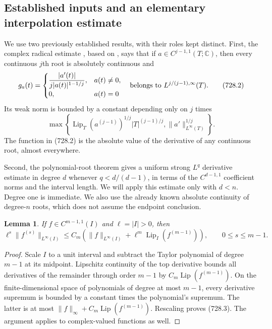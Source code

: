 \documentclass[11pt,a4paper]{article}
\newtheorem{lemma}[theorem]{Lemma}
\theoremstyle{remark}
\begin{document}
\subsection{Established inputs and an elementary interpolation estimate}

We use two previously established results, with their roles kept distinct.
First, the complex radical estimate
\cite[Proposition 1 and Corollary 2]{ParusinskiRainer}, based on
\cite{GhisiGobbino}, says that if $a\in C^{j-1,1}(T;\mathbb C)$, then every
continuous $j$th root is absolutely continuous and
\[
 g_a(t)=
 \begin{cases}
 \displaystyle\frac{|a'(t)|}{j|a(t)|^{1-1/j}},&a(t)\ne0,\\[4pt]
 0,&a(t)=0
 \end{cases}
 \quad\hbox{belongs to } L^{j/(j-1),\infty}(T).
 \tag{728.2}
\]
Its weak norm is bounded by a constant depending only on $j$ times
\[
 \max\left\{
 \operatorname{Lip}_T(a^{(j-1)})^{1/j}|T|^{(j-1)/j},
 \|a'\|_{L^\infty(T)}^{1/j}\right\}.
\]
The function in (728.2) is the absolute value of the derivative of any
continuous root, almost everywhere.

Second, the polynomial-root theorem
\cite[Theorem 1]{ParusinskiRainer} gives a uniform strong $L^q$ derivative
estimate in degree $d$ whenever $q<d/(d-1)$, in terms of the
$C^{d-1,1}$ coefficient norms and the interval length.  We will apply this
estimate only with $d<n$.  Degree one is immediate.  We also use the already
known absolute continuity of degree-$n$ roots, which does not assume the
endpoint conclusion.

\begin{lemma}
\label{lem:728interpolation}
If $f\in C^{m-1,1}(I)$ and $\ell=|I|>0$, then
\[
 \ell^s\|f^{(s)}\|_{L^\infty(I)}
 \le C_m\left(\|f\|_{L^\infty(I)}
           +\ell^m\operatorname{Lip}_I(f^{(m-1)})\right),
 \qquad 0\le s\le m-1.
 \tag{728.3}
\]
\end{lemma}
\begin{proof}
Scale $I$ to a unit interval and subtract the Taylor polynomial of degree
$m-1$ at its midpoint.  Lipschitz continuity of the top derivative bounds
all derivatives of the remainder through order $m-1$ by
$C_m\operatorname{Lip}(f^{(m-1)})$.  On the finite-dimensional space of
polynomials of degree at most $m-1$, every derivative supremum is bounded
by a constant times the polynomial's supremum.  The latter is at most
$\|f\|_\infty+C_m\operatorname{Lip}(f^{(m-1)})$.  Rescaling proves
(728.3).  The argument applies to complex-valued functions as well.
\end{proof}
\end{document}
